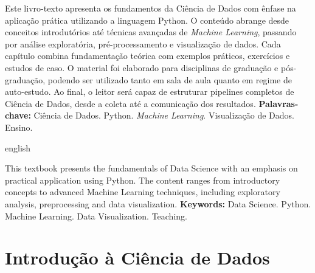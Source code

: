 \documentclass[
    12pt,
    oneside,
    a4paper,
    english,
    brazilian
    ]{abntex2}
\numberwithin{equation}{chapter}
\begin{document}
\pretextual
\maketitle
\newpage

\begin{resumo}
\noindent Este livro-texto apresenta os fundamentos da Ciência de Dados com ênfase na aplicação prática utilizando a linguagem Python. O conteúdo abrange desde conceitos introdutórios até técnicas avançadas de \textit{Machine Learning}, passando por análise exploratória, pré-processamento e visualização de dados. Cada capítulo combina fundamentação teórica com exemplos práticos, exercícios e estudos de caso. O material foi elaborado para disciplinas de graduação e pós-graduação, podendo ser utilizado tanto em sala de aula quanto em regime de auto-estudo. Ao final, o leitor será capaz de estruturar pipelines completos de Ciência de Dados, desde a coleta até a comunicação dos resultados.
\newline
\noindent \textbf{Palavras-chave:} Ciência de Dados. Python. \textit{Machine Learning}. Visualização de Dados. Ensino.
\end{resumo}

\begin{otherlanguage*}{english}
\begin{resumo}[Abstract]
\noindent This textbook presents the fundamentals of Data Science with an emphasis on practical application using Python. The content ranges from introductory concepts to advanced Machine Learning techniques, including exploratory analysis, preprocessing and data visualization.
\newline
\noindent \textbf{Keywords:} Data Science. Python. Machine Learning. Data Visualization. Teaching.
\end{resumo}
\end{otherlanguage*}
\newpage

\listoffigures*
\newpage

\listoftables*
\newpage

\textual

\chapter{Introdução à Ciência de Dados}
\end{document}

